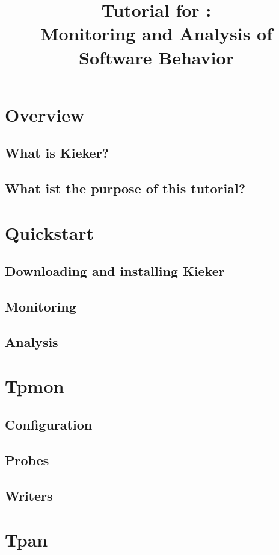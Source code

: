 \documentclass[a4paper, oneside, 11pt]{scrartcl}
\title{Tutorial for \Kieker:\\ Monitoring and Analysis of Software Behavior}
\begin{document}
\maketitle
\tableofcontents

\newpage

\section{Overview}
\subsection{What is Kieker?}
\subsection{What ist the purpose of this tutorial?}

\section{Quickstart}
\subsection{Downloading and installing Kieker}
\subsection{Monitoring}
\subsection{Analysis}

\section{Tpmon}
\subsection{Configuration}
\subsection{Probes}
\subsection{Writers}

\section{Tpan}
\end{document}
